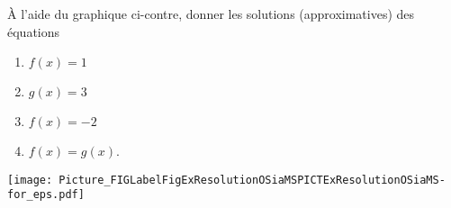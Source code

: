 
\begin{exercice}\label{exoSeconde-0070}

    \begin{multicols}{2}

        À l'aide du graphique ci-contre, donner les solutions (approximatives) des équations
        \begin{enumerate}
            \item
                \( f(x)=1\)
            \item
                \( g(x)=3\)
            \item
                \( f(x)=-2\)
            \item
                $f(x)=g(x)$.
        \end{enumerate}

        \columnbreak

%

\texttt{[image: Picture\_FIGLabelFigExResolutionOSiaMSPICTExResolutionOSiaMS-for\_eps.pdf]}


    \end{multicols}

\end{exercice}
